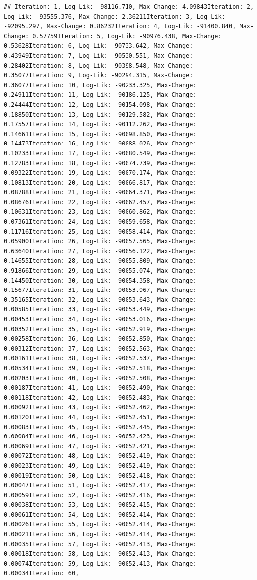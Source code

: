 \documentclass[
  english,
  man]{apa6}
\begin{document}
\begin{verbatim}
## Iteration: 1, Log-Lik: -98116.710, Max-Change: 4.09843Iteration: 2, Log-Lik: -93555.376, Max-Change: 2.36211Iteration: 3, Log-Lik: -92095.297, Max-Change: 0.86232Iteration: 4, Log-Lik: -91400.840, Max-Change: 0.57759Iteration: 5, Log-Lik: -90976.438, Max-Change: 0.53628Iteration: 6, Log-Lik: -90733.642, Max-Change: 0.43949Iteration: 7, Log-Lik: -90530.551, Max-Change: 0.28402Iteration: 8, Log-Lik: -90398.548, Max-Change: 0.35077Iteration: 9, Log-Lik: -90294.315, Max-Change: 0.36077Iteration: 10, Log-Lik: -90233.325, Max-Change: 0.24911Iteration: 11, Log-Lik: -90186.125, Max-Change: 0.24444Iteration: 12, Log-Lik: -90154.098, Max-Change: 0.18850Iteration: 13, Log-Lik: -90129.582, Max-Change: 0.17557Iteration: 14, Log-Lik: -90112.262, Max-Change: 0.14661Iteration: 15, Log-Lik: -90098.850, Max-Change: 0.14473Iteration: 16, Log-Lik: -90088.026, Max-Change: 0.10233Iteration: 17, Log-Lik: -90080.549, Max-Change: 0.12783Iteration: 18, Log-Lik: -90074.739, Max-Change: 0.09322Iteration: 19, Log-Lik: -90070.174, Max-Change: 0.10813Iteration: 20, Log-Lik: -90066.817, Max-Change: 0.08788Iteration: 21, Log-Lik: -90064.371, Max-Change: 0.08676Iteration: 22, Log-Lik: -90062.457, Max-Change: 0.10631Iteration: 23, Log-Lik: -90060.862, Max-Change: 0.07361Iteration: 24, Log-Lik: -90059.658, Max-Change: 0.11716Iteration: 25, Log-Lik: -90058.414, Max-Change: 0.05900Iteration: 26, Log-Lik: -90057.565, Max-Change: 0.63640Iteration: 27, Log-Lik: -90056.122, Max-Change: 0.14655Iteration: 28, Log-Lik: -90055.809, Max-Change: 0.91866Iteration: 29, Log-Lik: -90055.074, Max-Change: 0.14450Iteration: 30, Log-Lik: -90054.358, Max-Change: 0.15677Iteration: 31, Log-Lik: -90053.967, Max-Change: 0.35165Iteration: 32, Log-Lik: -90053.643, Max-Change: 0.00585Iteration: 33, Log-Lik: -90053.449, Max-Change: 0.00453Iteration: 34, Log-Lik: -90053.016, Max-Change: 0.00352Iteration: 35, Log-Lik: -90052.919, Max-Change: 0.00258Iteration: 36, Log-Lik: -90052.850, Max-Change: 0.00312Iteration: 37, Log-Lik: -90052.563, Max-Change: 0.00161Iteration: 38, Log-Lik: -90052.537, Max-Change: 0.00534Iteration: 39, Log-Lik: -90052.518, Max-Change: 0.00203Iteration: 40, Log-Lik: -90052.508, Max-Change: 0.00187Iteration: 41, Log-Lik: -90052.490, Max-Change: 0.00118Iteration: 42, Log-Lik: -90052.483, Max-Change: 0.00092Iteration: 43, Log-Lik: -90052.462, Max-Change: 0.00120Iteration: 44, Log-Lik: -90052.451, Max-Change: 0.00083Iteration: 45, Log-Lik: -90052.445, Max-Change: 0.00084Iteration: 46, Log-Lik: -90052.423, Max-Change: 0.00069Iteration: 47, Log-Lik: -90052.421, Max-Change: 0.00072Iteration: 48, Log-Lik: -90052.419, Max-Change: 0.00023Iteration: 49, Log-Lik: -90052.419, Max-Change: 0.00019Iteration: 50, Log-Lik: -90052.418, Max-Change: 0.00047Iteration: 51, Log-Lik: -90052.417, Max-Change: 0.00059Iteration: 52, Log-Lik: -90052.416, Max-Change: 0.00038Iteration: 53, Log-Lik: -90052.415, Max-Change: 0.00061Iteration: 54, Log-Lik: -90052.414, Max-Change: 0.00026Iteration: 55, Log-Lik: -90052.414, Max-Change: 0.00021Iteration: 56, Log-Lik: -90052.414, Max-Change: 0.00035Iteration: 57, Log-Lik: -90052.413, Max-Change: 0.00018Iteration: 58, Log-Lik: -90052.413, Max-Change: 0.00074Iteration: 59, Log-Lik: -90052.413, Max-Change: 0.00034Iteration: 60, 
\end{verbatim}
\end{document}
